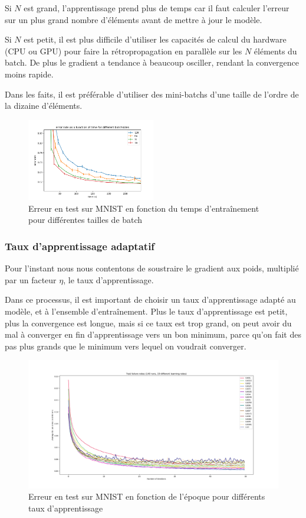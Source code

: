 Si $N$ est grand, l'apprentissage prend plus de temps car il faut calculer l'erreur sur un plus grand nombre d'éléments avant de mettre à jour le modèle.

Si $N$ est petit, il est plus difficile d'utiliser les capacités de calcul du hardware (CPU ou GPU) pour faire la rétropropagation en parallèle sur les $N$ éléments
du batch. De plus le gradient a tendance à beaucoup osciller, rendant la convergence moins rapide.

Dans les faits, il est préférable d'utiliser des mini-batchs d'une taille de l'ordre de la dizaine d'éléments. 

\begin{figure}[ht]
 \centering
 \includegraphics[width=0.5\textwidth]{img/time_vs_batchsize.png}
 \caption{Erreur en test sur MNIST en fonction du temps d'entraînement pour différentes tailles de batch}
 \label{fig:time_vs_batchsize.png}
\end{figure}

\subsubsection{Taux d'apprentissage adaptatif}

Pour l'instant nous nous contentons de soustraire le gradient aux poids, multiplié par un facteur $\eta$, le taux d'apprentissage.

Dans ce processus, il est important de choisir un taux d'apprentissage adapté au modèle, et à l'ensemble d'entraînement.
Plus le taux d'apprentissage est petit, plus la convergence est longue, mais si ce taux est trop grand, on peut avoir du mal à converger en fin d'apprentissage vers un bon minimum, parce qu'on fait des pas plus grands que le minimum vers lequel on voudrait converger.

\begin{figure}[ht]
 \centering
 \includegraphics[width=1\textwidth]{img/learning_rates.png}
 \caption{Erreur en test sur MNIST en fonction de l'époque pour différents taux d'apprentissage}
 \label{fig:learning_rates.png}
\end{figure}

